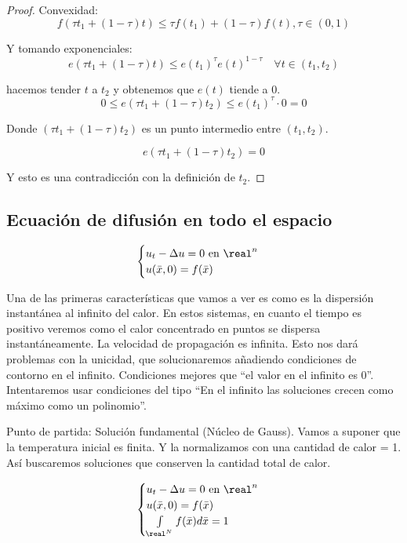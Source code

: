 \begin{proof}
			\begin{minipage}[t]{\linewidth}
			\end{minipage}

			Convexidad:
			\[f(\tau t_1 + (1-\tau)t) \leq \tau f(t_1) + (1-\tau) f(t), \tau \in (0,1)\]

			Y tomando exponenciales:
			\[e(\tau t_1 + (1-\tau)t) \leq e(t_1)^\tau e(t)^{1-\tau} \quad \forall t \in (t_1,t_2)\]

			hacemos tender $t$ a $t_2$ y obtenemos que $e(t)$ tiende a 0.
			\[ 0 \leq e(\tau t_1 + (1-\tau)t_2) \leq e(t_1)^\tau \cdot 0 = 0\]

			Donde $(\tau t_1 + (1-\tau)t_2)$ es un punto intermedio entre $(t_1,t_2)$.

			\[e(\tau t_1+(1-\tau)t_2) = 0\]

			Y esto es una contradicción con la definición de $t_2$.

		\end{proof}

	\subsection{Ecuación de difusión en todo el espacio}

		\[\begin{cases}
			u_t - \Delta u = 0 \text{ en } \real^n\\
			u(\bar{x},0) = f(\bar{x})
		\end{cases}\]

		Una de las primeras características que vamos a ver es como es la dispersión instantánea al infinito del calor. En estos sistemas, en cuanto el tiempo es positivo veremos como el calor concentrado en puntos se dispersa instantáneamente. La velocidad de propagación es infinita. Esto nos dará problemas con la unicidad, que solucionaremos añadiendo condiciones de contorno en el infinito. Condiciones mejores que ``el valor en el infinito es 0''. Intentaremos usar condiciones del tipo ``En el infinito las soluciones crecen como máximo como un polinomio''.

		Punto de partida: Solución fundamental (Núcleo de Gauss). Vamos a suponer que la temperatura inicial es finita. Y la normalizamos con una cantidad de calor = 1. Así buscaremos soluciones que conserven la cantidad total de calor.

		\[\begin{cases}
			u_t - \Delta u = 0 \text{ en } \real^n\\
			u(\bar{x},0) = f(\bar{x}) \\
			\int\limits_{\real^N} f(\bar{x}) d\bar{x} = 1
		\end{cases}\]


